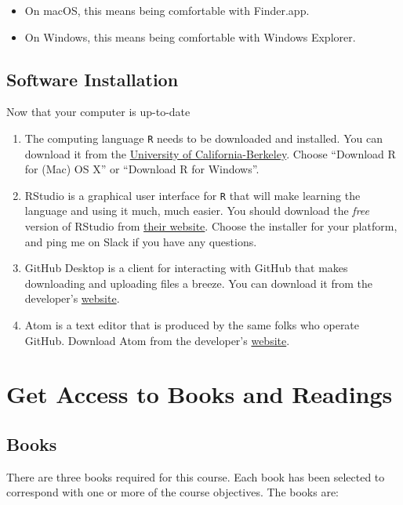 \documentclass[]{book}
\providecommand{\tightlist}{%
  \setlength{\itemsep}{0pt}\setlength{\parskip}{0pt}}
\theoremstyle{definition}
\theoremstyle{definition}
\theoremstyle{definition}
\theoremstyle{remark}
\begin{document}
\begin{itemize}
\tightlist
\item
  On macOS, this means being comfortable with Finder.app.
\item
  On Windows, this means being comfortable with Windows Explorer.
\end{itemize}

\subsection{Software Installation}\label{software-installation}

Now that your computer is up-to-date

\begin{enumerate}
\def\labelenumi{\arabic{enumi}.}
\item
  The computing language \texttt{R} needs to be downloaded and
  installed. You can download it from the
  \href{https://cran.cnr.berkeley.edu}{University of
  California-Berkeley}. Choose ``Download R for (Mac) OS X'' or
  ``Download R for Windows''.
\item
  RStudio is a graphical user interface for \texttt{R} that will make
  learning the language and using it much, much easier. You should
  download the \emph{free} version of RStudio from
  \href{https://www.rstudio.com/products/rstudio/download/\#download}{their
  website}. Choose the installer for your platform, and ping me on Slack
  if you have any questions.
\item
  GitHub Desktop is a client for interacting with GitHub that makes
  downloading and uploading files a breeze. You can download it from the
  developer's \href{http://desktop.github.com}{website}.
\item
  Atom is a text editor that is produced by the same folks who operate
  GitHub. Download Atom from the developer's
  \href{http://atom.io}{website}.
\end{enumerate}

\section{Get Access to Books and
Readings}\label{get-access-to-books-and-readings}

\subsection{Books}\label{books}

There are three books required for this course. Each book has been
selected to correspond with one or more of the course objectives. The
books are:
\end{document}
